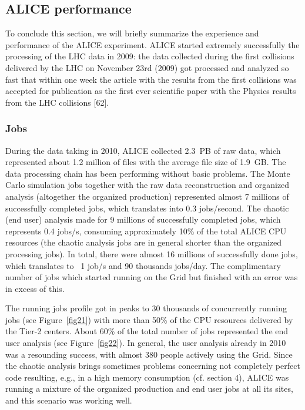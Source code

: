 \documentclass{intech}
\begin{document}
\subsection{ALICE performance}
%
To conclude this section, we will briefly summarize the experience
and performance of the ALICE experiment. ALICE started extremely
successfully the processing of the LHC data in 2009: the data
collected during the first collisions delivered by the LHC on
November 23rd (2009) got processed and analyzed so fast that within
one week the article with the results from the first collisions was
accepted for publication as the first ever scientific paper with the
Physics results from the LHC collisions [62].

\subsubsection{Jobs}
%
During the data taking in 2010, ALICE collected 2.3~PB of raw data,
which represented about 1.2 million of files with the average file
size of 1.9~GB. The data processing chain has been performing
without basic problems.  The Monte Carlo simulation jobs together
with the raw data reconstruction and organized analysis (altogether
the organized production) represented almost 7 millions of
successfully completed jobs, which translates into 0.3 jobs/second.
The chaotic (end user) analysis made for 9 millions of successfully
completed jobs, which represents 0.4 jobs/s, consuming approximately
10\% of the total ALICE CPU resources (the chaotic analysis jobs are
in general shorter than the organized processing jobs).  In total,
there were almost 16 millions of successfully done jobs, which
translates to ~1 job/s and 90 thousands jobs/day. The complimentary
number of jobs which started running on the Grid but finished with
an error was in excess of this.

The running jobs profile got in peaks to 30 thousands of
concurrently running jobs (see Figure~\ref{fig21}) with more than
50\% of the CPU resources delivered by the Tier-2 centers. About
60\% of the total number of jobs represented the end user analysis
(see Figure~\ref{fig22}). In general, the user analysis already in
2010 was a resounding success, with almost 380 people actively using
the Grid. Since the chaotic analysis brings sometimes problems
concerning not completely perfect code resulting, e.g., in a high
memory consumption (cf. section 4), ALICE was running a mixture of
the organized production and end user jobs at all its sites, and
this scenario was working well.
\end{document}
